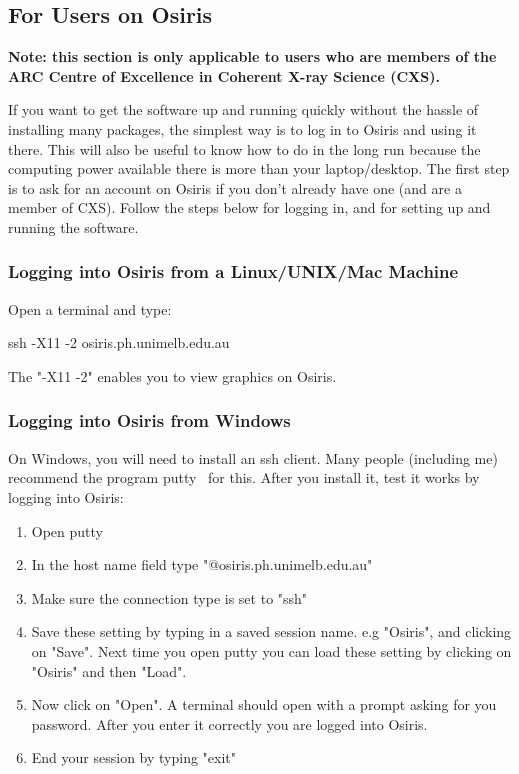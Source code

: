\documentclass[]{nadia}
\begin{document}
\subsection{For Users on Osiris}

\bf{Note: this section is only applicable to users who are members of
the ARC Centre of Excellence in Coherent X-ray Science (CXS).}

If you want to get the software up and running quickly without the hassle of
installing many packages, the simplest way is to log in to Osiris
and using it there. This will also be useful to know how to do in the
long run because the computing power available there is more than your
laptop/desktop. The first step is to ask for an account on Osiris if
you don't already have one (and are a member of CXS). Follow the
steps below for logging in, and for setting up and running the
software.

\subsubsection{Logging into Osiris from a Linux/UNIX/Mac Machine}

Open a terminal and type: 
\begin{myverbatim}
  ssh -X11 -2 osiris.ph.unimelb.edu.au 
\end{myverbatim}
The "-X11 -2" enables you to view graphics on Osiris.

\subsubsection{Logging into Osiris from Windows}

On Windows, you will need to install an ssh client. Many people
(including me) recommend the program putty~\cite{putty} for this.  After
you install it, test it works by logging into Osiris:
\begin{enumerate}
\item Open putty 
\item In the host name field type "@osiris.ph.unimelb.edu.au" 
\item Make sure the connection type is set to "ssh" 
\item Save these setting by typing in a saved session name. e.g
  "Osiris", and clicking on "Save". Next time you open putty you can load
  these setting by clicking on "Osiris" and then "Load".
\item Now click on "Open". A terminal should open with a prompt asking
  for you password. After you enter it correctly you are logged into
  Osiris.
\item End your session by typing "exit"
\end{enumerate}
\end{document}
